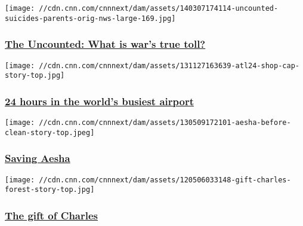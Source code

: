 \href{http://www.cnn.com/interactive/2014/03/us/uncounted-suicides/index.html}{}

\texttt{[image: //cdn.cnn.com/cnnnext/dam/assets/140307174114-uncounted-suicides-parents-orig-nws-large-169.jpg]}

\hypertarget{the-uncounted-what-is-wars-true-toll}{%
\subsubsection{\texorpdfstring{\href{http://www.cnn.com/interactive/2014/03/us/uncounted-suicides/index.html}{The
Uncounted: What is war's true
toll?}}{The Uncounted: What is war's true toll?}}\label{the-uncounted-what-is-wars-true-toll}}

\href{http://www.cnn.com/ATL24}{}

\texttt{[image: //cdn.cnn.com/cnnnext/dam/assets/131127163639-atl24-shop-cap-story-top.jpg]}

\hypertarget{24-hours-in-the-worlds-busiest-airport}{%
\subsubsection{\texorpdfstring{\href{http://www.cnn.com/ATL24}{24 hours
in the world's busiest
airport}}{24 hours in the world's busiest airport}}\label{24-hours-in-the-worlds-busiest-airport}}

\href{http://www.cnn.com/interactive/2012/05/world/saving.aesha/}{}

\texttt{[image: //cdn.cnn.com/cnnnext/dam/assets/130509172101-aesha-before-clean-story-top.jpeg]}

\hypertarget{saving-aesha}{%
\subsubsection{\texorpdfstring{\href{http://www.cnn.com/interactive/2012/05/world/saving.aesha/}{Saving
Aesha}}{Saving Aesha}}\label{saving-aesha}}

\href{http://www.cnn.com/interactive/2012/05/us/gift.of.charles/}{}

\texttt{[image: //cdn.cnn.com/cnnnext/dam/assets/120506033148-gift-charles-forest-story-top.jpg]}

\hypertarget{the-gift-of-charles}{%
\subsubsection{\texorpdfstring{\href{http://www.cnn.com/interactive/2012/05/us/gift.of.charles/}{The
gift of Charles}}{The gift of Charles}}\label{the-gift-of-charles}}

